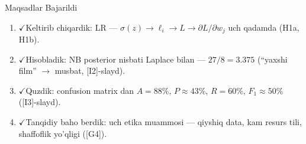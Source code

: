 \documentclass[aspectratio=169,11pt]{beamer}
\newcommand{\bajarildi}{{\color{deepgreen}\large$\checkmark$}\;}
\begin{document}
\begin{frame}{Maqsadlar Bajarildi}
  \begin{enumerate}\setlength{\itemsep}{9pt}
    \item \bajarildi Keltirib chiqardik: LR ---
          $\sigma(z)\to\ell_i\to L\to\partial L/\partial w_j$
          uch qadamda (H1a, H1b).
    \item \bajarildi Hisobladik: NB posterior nisbati Laplace bilan ---
          $27/8=\mathbf{3.375}$
          (``yaxshi film'' $\to$ musbat, [I2]-slayd).
    \item \bajarildi Quzdik: confusion matrix dan
          $A{=}88\%$, $P{\approx}43\%$, $R{=}60\%$, $F_1{\approx}50\%$
          ([I3]-slayd).
    \item \bajarildi Tanqidiy baho berdik:
          uch etika muammosi ---
          qiyshiq data, kam resurs tili, shaffoflik yo'qligi ([G4]).
  \end{enumerate}
\end{frame}
\end{document}
